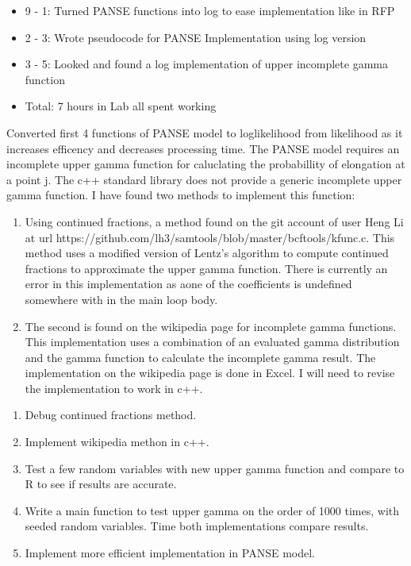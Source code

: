 \documentclass[12pt,hyperref]{labbook}
\begin{document}
\begin{itemize}
	\item 9 - 1: Turned PANSE functions into log to ease implementation like in RFP
	\item 2 - 3: Wrote pseudocode for PANSE Implementation using log version
	\item 3 - 5: Looked and found a log implementation of upper incomplete gamma function
	\item Total: 7 hours in Lab all spent working
\end{itemize}
Converted first 4 functions of PANSE model to loglikelihood from likelihood as it increases efficency and decreases processing time. The PANSE model requires an incomplete upper gamma function for caluclating the probabillity of elongation at a point j. The c++ standard library does not provide a generic incomplete upper gamma function. I have found two methods to implement this function:
\begin{enumerate}
	\item Using continued fractions, a method found on the git account of user Heng Li at url https://github.com/lh3/samtools/blob/master/bcftools/kfunc.c. This method uses a modified version of Lentz's algorithm to compute continued fractions to approximate the upper gamma function. There is currently an error in this implementation as aone of the coefficients is undefined somewhere with in the main loop body.
	\item The second is found on the wikipedia page for incomplete gamma functions. This implementation uses a combination of an evaluated gamma distribution and the gamma function to calculate the incomplete gamma result. The implementation on the wikipedia page is done in Excel. I will need to revise the implementation to work in c++.
\end{enumerate}
\begin{enumerate}
	\item Debug continued fractions method.
	\item Implement wikipedia methon in c++.
	\item Test a few random variables with new upper gamma function and compare to R to see if results are accurate.
	\item Write a main function to test upper gamma on the order of 1000 times, with seeded random variables. Time both implementations compare results.
	\item Implement more efficient implementation in PANSE model.
\end{enumerate}
\end{document}
